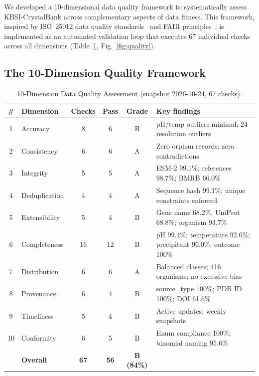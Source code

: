 \documentclass[11pt]{article}
\begin{document}
We developed a 10-dimensional data quality framework to systematically assess KBSI-CrystalBank across complementary aspects of data fitness. This framework, inspired by ISO~25012 data quality standards~\cite{iso25012} and FAIR principles~\cite{wilkinson2016}, is implemented as an automated validation loop that executes 67 individual checks across all dimensions (Table~\ref{tab:quality}, Fig.~\ref{fig:quality}).

\subsection*{The 10-Dimension Quality Framework}

\begin{table}[H]
\centering
\caption{10-Dimension Data Quality Assessment (snapshot 2026-10-24, 67 checks).}
\label{tab:quality}
\small
\begin{tabular}{clcccp{5.5cm}}
\toprule
\textbf{\#} & \textbf{Dimension} & \textbf{Checks} & \textbf{Pass} & \textbf{Grade} & \textbf{Key findings} \\
\midrule
1 & Accuracy & 8 & 6 & B & pH/temp outliers minimal; 24 resolution outliers \\
2 & Consistency & 6 & 6 & A & Zero orphan records; zero contradictions \\
3 & Integrity & 5 & 5 & A & ESM-2 99.1\%; references 98.7\%; BMRB 66.0\% \\
4 & Deduplication & 4 & 4 & A & Sequence hash 99.1\%; unique constraints enforced \\
5 & Extensibility & 5 & 4 & B & Gene name 68.2\%; UniProt 68.8\%; organism 93.7\% \\
6 & Completeness & 16 & 12 & B & pH 99.4\%; temperature 92.6\%; precipitant 96.0\%; outcome 100\% \\
7 & Distribution & 6 & 6 & A & Balanced classes; 416 organisms; no excessive bias \\
8 & Provenance & 6 & 4 & B & source\_type 100\%; PDB ID 100\%; DOI 61.6\% \\
9 & Timeliness & 5 & 4 & B & Active updates; weekly snapshots \\
10 & Conformity & 6 & 5 & B & Enum compliance 100\%; binomial naming 95.6\% \\
\midrule
 & \textbf{Overall} & \textbf{67} & \textbf{56} & \textbf{B (84\%)} & \\
\bottomrule
\end{tabular}
\end{table}
\end{document}
